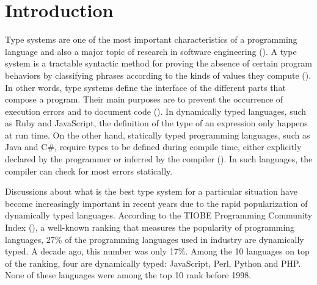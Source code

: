 \documentclass[msc]{ppgccufmg}
\begin{document}





\newcommand{\dummytxt}{\dummytxta\dummytxtb\dummytxtc}

\chapter{Introduction}

Type systems are one of the most important characteristics of a programming language and also a major topic of research in software engineering (\cite{Furr09,takikawa12,gradual_typing}).
A type system is a tractable syntactic method for proving the absence of certain program behaviors by classifying phrases according to the kinds of values they compute (\cite{types_and_programming_languages}).
In other words, type systems define the interface of the different parts that compose a program.
Their main purposes are to prevent the occurrence of execution errors and to document code (\cite{type_systems}).
In dynamically typed languages, such as Ruby and JavaScript, the definition of the type of an expression only happens at run time.
On the other hand, statically typed programming languages, such as Java and C\#, require types to be defined during compile time, either explicitly declared by the programmer or inferred by the compiler (\cite{Milner78}).
In such languages, the compiler can check for most errors statically. 

Discussions about what is the best type system for a particular situation have become increasingly important in recent years due to the rapid popularization of dynamically typed languages. 
According to the TIOBE Programming Community Index (\cite{tiobe}), a well-known ranking that measures the popularity of programming languages, 27\% of the programming languages used in industry are dynamically typed. 
A decade ago, this number was only 17\%. 
Among the 10 languages on top of the ranking, four are dynamically typed: JavaScript, Perl, Python and PHP. 
None of these languages were among the top 10 rank before 1998.
\end{document}
